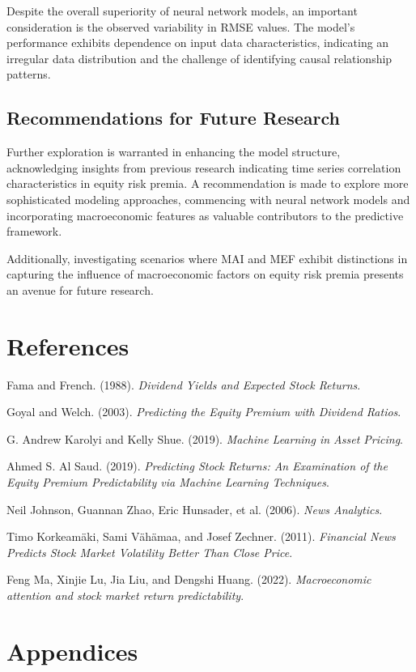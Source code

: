 \documentclass{article}
\begin{document}
Despite the overall superiority of neural network models, an important consideration is the observed variability in RMSE values. The model's performance exhibits dependence on input data characteristics, indicating an irregular data distribution and the challenge of identifying causal relationship patterns.

\subsection{Recommendations for Future Research}

Further exploration is warranted in enhancing the model structure, acknowledging insights from previous research indicating time series correlation characteristics in equity risk premia. A recommendation is made to explore more sophisticated modeling approaches, commencing with neural network models and incorporating macroeconomic features as valuable contributors to the predictive framework.

\noindent Additionally, investigating scenarios where MAI and MEF exhibit distinctions in capturing the influence of macroeconomic factors on equity risk premia presents an avenue for future research. 

\newpage

\section{References}


\begin{thebibliography}{9}
Fama and French. (1988). \emph{Dividend Yields and Expected Stock Returns}. 

Goyal and Welch. (2003). \emph{Predicting the Equity Premium with Dividend Ratios}.

G. Andrew Karolyi and Kelly Shue. (2019). \emph{Machine Learning in Asset Pricing}.

Ahmed S. Al Saud. (2019). \emph{Predicting Stock Returns: An Examination of the Equity Premium Predictability via Machine Learning Techniques}.

Neil Johnson, Guannan Zhao, Eric Hunsader, et al. (2006). \emph{News Analytics}.

Timo Korkeamäki, Sami Vähämaa, and Josef Zechner. (2011). \emph{Financial News Predicts Stock Market Volatility Better Than Close Price}.

Feng Ma, Xinjie Lu, Jia Liu, and Dengshi Huang. (2022). \emph{Macroeconomic attention and stock market return predictability}.

\end{thebibliography}

\newpage

\section{Appendices}
\end{document}
